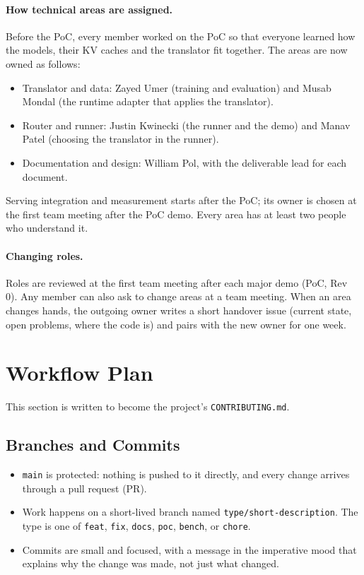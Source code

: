 \documentclass{article}
\begin{document}
\paragraph{How technical areas are assigned.} Before the PoC, every
member worked on the PoC so that everyone learned how the models, their KV
caches and the translator fit together. The areas are now owned as
follows:
\begin{itemize}[noitemsep]
  \item Translator and data: Zayed Umer (training and evaluation) and
  Musab Mondal (the runtime adapter that applies the translator).
  \item Router and runner: Justin Kwinecki (the runner and the demo) and
  Manav Patel (choosing the translator in the runner).
  \item Documentation and design: William Pol, with the deliverable lead
  for each document.
\end{itemize}
Serving integration and measurement starts after the PoC; its owner is
chosen at the first team meeting after the PoC demo. Every area has at
least two people who understand it.

\paragraph{Changing roles.} Roles are reviewed at the first team meeting
after each major demo (PoC, Rev 0). Any member can also ask to change areas
at a team meeting. When an area changes hands, the outgoing owner writes
a short handover issue (current state, open problems, where the code is)
and pairs with the new owner for one week.

\section{Workflow Plan}
\label{sec:workflow}

This section is written to become the project's \texttt{CONTRIBUTING.md}.

\subsection{Branches and Commits}

\begin{itemize}
  \item \texttt{main} is protected: nothing is pushed to it directly, and
  every change arrives through a pull request (PR).
  \item Work happens on a short-lived branch named
  \texttt{type/short-description}. The type is one of \texttt{feat},
  \texttt{fix}, \texttt{docs}, \texttt{poc}, \texttt{bench}, or
  \texttt{chore}.
  \item Commits are small and focused, with a message in the imperative
  mood that explains why the change was made, not just what changed.
\end{itemize}
\end{document}

